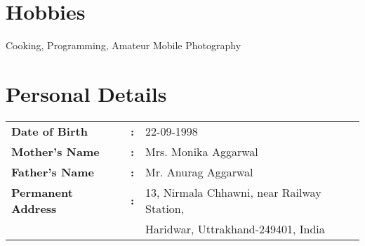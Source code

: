 \documentclass[a4paper, margin, centered]{res}
\begin{document}
\begin{resume}
\begin{itemize}[leftmargin=*]
\end{itemize}
\section{Hobbies}
Cooking, Programming, Amateur Mobile Photography
\section{Personal Details}
\begin{table}[H]
\begin{tabular}{lll}
\textbf{Date of Birth} & \textbf{:} & 22-09-1998 \\
\textbf{Mother's Name} & \textbf{:} & Mrs. Monika Aggarwal \\
\textbf{Father's Name} & \textbf{:} & Mr. Anurag Aggarwal \\
\textbf{Permanent Address} & \textbf{:} & 13, Nirmala Chhawni, near Railway Station,\\
\textbf{} & \textbf{} & Haridwar, Uttrakhand-249401, India
\end{tabular}
\end{table}



\vspace{6in}

%


\end{resume}
\end{document}
